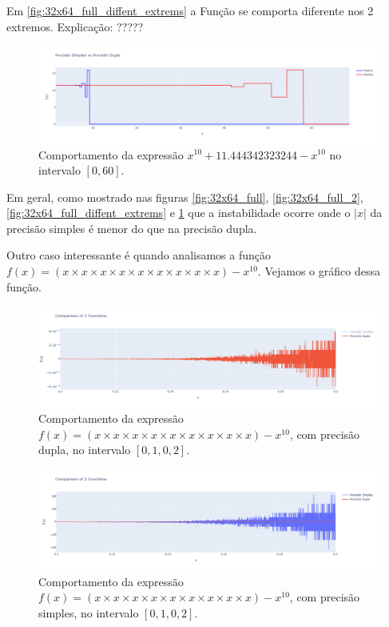 Em \ref{fig:32x64_full_diffent_extrems} a Função se comporta diferente nos 2 extremos.
Explicação: ?????

\begin{figure}[h]
    \centering 
    \includegraphics[width=1\textwidth]{Imagens/32x64.png}
    \caption{Comportamento da expressão \(x^{10} + 11.444342323244 - x^{10}\) no intervalo \([0, 60]\).}
    \label{fig:32x64}
\end{figure}

Em geral, como mostrado nas figuras \ref{fig:32x64_full}, \ref{fig:32x64_full_2}, \ref{fig:32x64_full_diffent_extrems} e \ref{fig:32x64} que a instabilidade ocorre onde o $|x|$ da precisão simples é menor do que na precisão dupla.

Outro caso interessante é quando analisamos a função $f(x) = (x\times x\times x\times x\times x\times x\times x\times x \times x) - x^{10} $. Vejamos o gráfico dessa função.
\begin{figure}[H]
    \centering 
    \includegraphics[width=1\textwidth]{Imagens/timesXpot_literal0.png}
    \caption{Comportamento da expressão $f(x) = (x \times x \times x \times x \times x \times x \times x \times x \times x) - x^{10}$, com precisão dupla, no intervalo \([0{,}1, 0{,}2]\).}
    \label{fig:timesXpot_literal0}
\end{figure}

\begin{figure}[H]
    \centering 
    \includegraphics[width=1\textwidth]{Imagens/timesXpot_literal0_1.png}
    \caption{Comportamento da expressão $f(x) = (x \times x \times x \times x \times x \times x \times x \times x \times x) - x^{10}$, com precisão simples, no intervalo \([0{,}1, 0{,}2]\).}
    \label{fig:timesXpot_literal0_1}
\end{figure}

